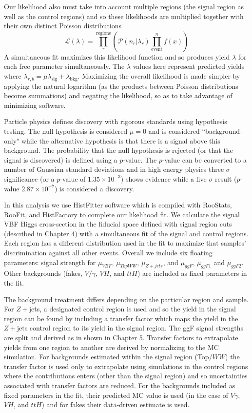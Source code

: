 Our likelihood also must take into account multiple regions (the signal region as well as the control regions) and so these likelihoods are multiplied together with their own distinct Poisson distributions
\begin{equation}
\mathcal{L}(\lambda)=\prod_r^{\text{regions}}(\mathcal{P}(n_r|\lambda_r)\prod_{\text{event}}^n f(x))
\end{equation}
A simultaneous fit maximizes this likelihood function and so produces yield $\lambda$ for each free parameter simultaneously. The $\lambda$ values here represent predicted yields where $\lambda_{r,b} = \mu \lambda_{\text{sig}}+\lambda_{\text{bkg}}$. Maximizing the overall likelihood is made simpler by applying the natural logarithm (as the products between Poisson distributions become summations) and negating the likelihood, so as to take advantage of minimizing software.  

Particle physics defines discovery with rigorous standards using hypothesis testing. The null hypothesis is considered $\mu=0$ and is considered ``background-only" while the alternative hypothesis is that there is a signal above this background. The probability that the null hypothesis is rejected (or that the signal is discovered) is defined using a $p$-value. The $p$-value can be converted to a number of Gaussian standard deviations and in high energy physics three $\sigma$ significance (or a $p$-value of $1.35 \times 10^{-3}$) shows evidence while a five $\sigma$ result ($p$-value $2.87\times10^{-7}$) is considered a discovery.

In this analysis we use HistFitter software which is compiled with RooStats, RooFit, and HistFactory to complete our likelihood fit. We calculate the signal VBF Higgs cross-section in the fiducial space defined with signal region cuts (described in Chapter 4) with a simultaneous fit of the signal and control regions. Each region has a different distribution used in the fit to maximize that samples' discrimination against all other events. Overall we include six floating parameters: signal strength for $\mu_{VBF}$, $\mu_{TopWW}$, $\mu_{Z+jets}$, and $\mu_{ggF}$, $\mu_{ggF1}$ and $\mu_{ggF2}$. Other backgrounds (fakes, $V/\gamma$, $VH$, and $ttH$) are included as fixed parameters in the fit. 

The background treatment differs depending on the particular region and sample. For $Z+$jets, a designated control region is used and so the yield in the signal region can be found by including a transfer factor which maps the yield in the $Z+$jets control region to its yield in the signal region. The ggF signal strengths are split and derived as in shown in Chapter 5. Transfer factors to extrapolate yields from one region to another are derived by normalizing to the MC simulation. For backgrounds estimated within the signal region (Top/$WW$) the transfer factor is used only to extrapolate using simulations in the control regions where the contributions enters (other than the signal region) and so uncertainties associated with transfer factors are reduced. For the backgrounds included as fixed parameters in the fit, their predicted MC value is used (in the case of $V\gamma$, $VH$, and $ttH$) and for fakes their data-driven estimate is used. 

